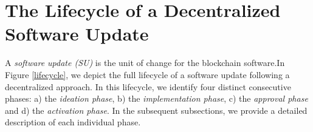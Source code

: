 \section{The Lifecycle of a Decentralized Software Update}
A \emph{software update (SU)} is the unit of change for the blockchain software.In Figure \ref{lifecycle}, we depict 
the full lifecycle of a software update following a decentralized approach. In this lifecycle, we identify four distinct consecutive phases: a) the \emph{ideation phase}, b) the \emph{implementation phase}, c) the \emph{approval phase} and d) the \emph{activation phase}. In the subsequent subsections, we provide a detailed description of each individual phase.


